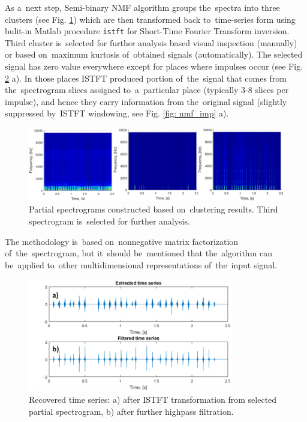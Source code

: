 As a~next step, Semi-binary NMF algorithm groups the~spectra into three clusters (see Fig. \ref{fig: nmf_partial}) which are then transformed back to~time-series form using bulit-in Matlab procedure \texttt{istft} for Short-Time Fourier Transform inversion. Third cluster is~selected for further analysis based visual inspection (manually) or based on~maximum kurtosis of~obtained signals (automatically). The selected signal has zero value everywhere except for places where impulses occur (see Fig. \ref{fig: nmf_out} a). In those places ISTFT produced portion of~the~signal that comes from the~spectrogram slices assigned to~a~particular place (typically 3-8 slices per impulse), and hence they carry information from the~original signal (slightly suppressed by~ISTFT windowing, see Fig. \ref{fig: nmf_imp} a).

\begin{figure}[ht!]
\centering
\includegraphics[width = \textwidth]{wykresy/nmf_partial.png}
\caption{Partial spectrograms constructed based on~clustering results. Third spectrogram is~selected for further analysis.}
\label{fig: nmf_partial}
\end{figure}

The methodology is~based on~nonnegative matrix factorization of~the~spectrogram, but it~should be~mentioned that the~algorithm can be~applied to~other multidimensional representations of~the~input signal. 

\begin{figure}[ht!]
\centering
\includegraphics[width = 0.8\textwidth]{wykresy/nmf_out.png}
\caption{Recovered time series: a) after ISTFT transformation from selected partial spectrogram, b) after further highpass filtration.}
\label{fig: nmf_out}
\end{figure}

